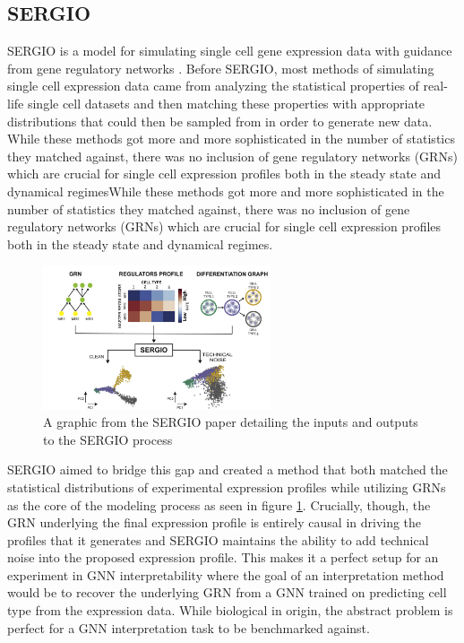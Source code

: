 \subsection{SERGIO}
SERGIO is a model for simulating single cell gene expression data with guidance from gene regulatory networks \cite{dibaeinia_sergio_2020}. Before SERGIO, most methods of simulating single cell expression data came from analyzing the statistical properties of real-life single cell datasets and then matching these properties with appropriate distributions that could then be sampled from in order to generate new data. While these methods got more and more sophisticated in the number of statistics they matched against, there was no inclusion of gene regulatory networks (GRNs) which are crucial for single cell expression profiles both in the steady state and dynamical regimesWhile these methods got more and more sophisticated in the number of statistics they matched against, there was no inclusion of gene regulatory networks (GRNs) which are crucial for single cell expression profiles both in the steady state and dynamical regimes.
\begin{figure}[t]
	\centering
	\includegraphics[width=0.6\textwidth]{images/sergio.png}
	\caption{A graphic from the SERGIO paper detailing the inputs and outputs to the SERGIO process \cite{dibaeinia_sergio_2020}}
	\label{fig:sergio}
\end{figure}

SERGIO aimed to bridge this gap and created a method that both matched the statistical distributions of experimental expression profiles while utilizing GRNs as the core of the modeling process as seen in figure \ref{fig:sergio}. Crucially, though, the GRN underlying the final expression profile is entirely causal in driving the profiles that it generates and SERGIO maintains the ability to add technical noise into the proposed expression profile. This makes it a perfect setup for an experiment in GNN interpretability where the goal of an interpretation method would be to recover the underlying GRN from a GNN trained on predicting cell type from the expression data. While biological in origin, the abstract problem is perfect for a GNN interpretation task to be benchmarked against.
